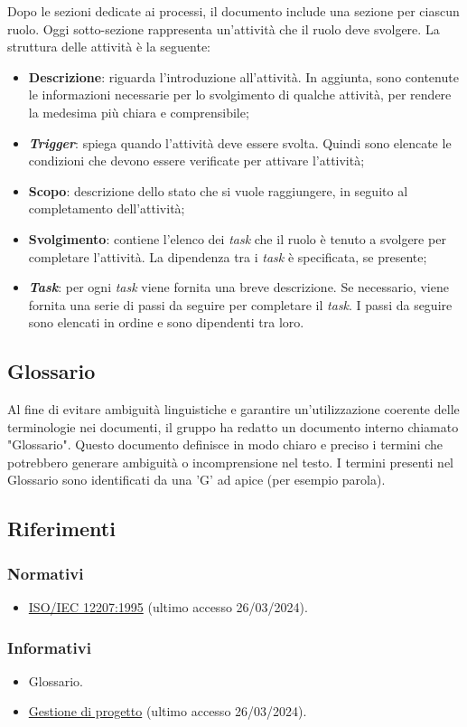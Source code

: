Dopo le sezioni dedicate ai processi, il documento include una sezione per
ciascun ruolo. Oggi sotto-sezione rappresenta un'attività che il ruolo deve
svolgere.  La struttura delle attività è la seguente:
\begin{itemize}
	\item \textbf{Descrizione}: riguarda l'introduzione all'attività.
	      In aggiunta, sono contenute le informazioni necessarie per lo
	      svolgimento di qualche attività, per rendere la medesima più chiara e
	      comprensibile;

	\item \textbf{\textit{Trigger}}: spiega quando l'attività deve essere
	      svolta. Quindi sono elencate le condizioni che devono essere
	      verificate per attivare l'attività;

	\item \textbf{Scopo}: descrizione dello stato che si vuole raggiungere, in
	      seguito al completamento dell'attività;

	\item \textbf{Svolgimento}: contiene l'elenco dei \textit{task} che il
	      ruolo è tenuto a svolgere per completare l'attività. La dipendenza tra
	      i \textit{task} è specificata, se presente;

	\item \textbf{\textit{Task}}: per ogni \textit{task} viene fornita una
	      breve descrizione. Se necessario, viene fornita una serie di passi da
	      seguire per completare il \textit{task}. I passi da seguire sono
	      elencati in ordine e sono dipendenti tra loro.
\end{itemize}

\subsection{Glossario}
Al fine di evitare ambiguità linguistiche e garantire un’utilizzazione coerente delle terminologie nei documenti, il gruppo ha redatto un documento interno chiamato "Glossario". Questo
documento definisce in modo chiaro e preciso i termini che potrebbero generare ambiguità
o incomprensione nel testo. I termini presenti nel Glossario sono identificati da una ’G’ ad
apice (per esempio parola\g ).


\subsection{Riferimenti}

\subsubsection{Normativi}
\begin{itemize}
	\item
	      \href{https://www.math.unipd.it/~tullio/IS-1/2009/Approfondimenti/ISO_12207-1995.pdf}{ISO/IEC 12207:1995} (ultimo accesso 26/03/2024).
\end{itemize}

\subsubsection{Informativi}
\begin{itemize}
	\item Glossario.
	\item \href{https://www.math.unipd.it/~tullio/IS-1/2023/Dispense/T4.pdf}{Gestione di progetto} (ultimo accesso 26/03/2024).
\end{itemize}
